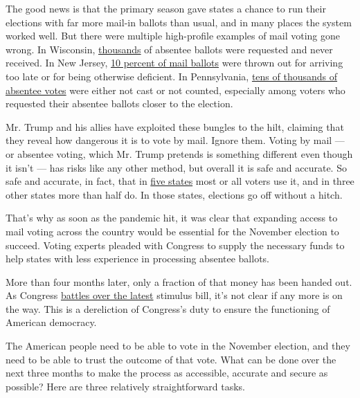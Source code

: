 The good news is that the primary season gave states a chance to run
their elections with far more mail-in ballots than usual, and in many
places the system worked well. But there were multiple high-profile
examples of mail voting gone wrong. In Wisconsin,
\href{https://www.nytimes3xbfgragh.onion/2020/04/09/us/politics/wisconsin-election-absentee-coronavirus.html}{thousands}
of absentee ballots were requested and never received. In New Jersey,
\href{https://www.njspotlight.com/2020/06/one-in-10-ballots-rejected-in-last-months-vote-by-mail-elections/}{10
percent of mail ballots} were thrown out for arriving too late or for
being otherwise deficient. In Pennsylvania,
\href{https://www.inquirer.com/politics/election/pa-mail-ballot-deadlines-disenfranchisement-20200730.html}{tens
of thousands of absentee votes} were either not cast or not counted,
especially among voters who requested their absentee ballots closer to
the election.

Mr. Trump and his allies have exploited these bungles to the hilt,
claiming that they reveal how dangerous it is to vote by mail. Ignore
them. Voting by mail --- or absentee voting, which Mr. Trump pretends is
something different even though it isn't --- has risks like any other
method, but overall it is safe and accurate. So safe and accurate, in
fact, that in
\href{https://www.ncsl.org/research/elections-and-campaigns/all-mail-elections.aspx}{five
states} most or all voters use it, and in three other states more than
half do. In those states, elections go off without a hitch.

That's why as soon as the pandemic hit, it was clear that expanding
access to mail voting across the country would be essential for the
November election to succeed. Voting experts pleaded with Congress to
supply the necessary funds to help states with less experience in
processing absentee ballots.

More than four months later, only a fraction of that money has been
handed out. As Congress
\href{https://www.nytimes3xbfgragh.onion/2020/07/30/opinion/mitch-mcconnell-coronavirus-economy.html}{battles
over the latest} stimulus bill, it's not clear if any more is on the
way. This is a dereliction of Congress's duty to ensure the functioning
of American democracy.

The American people need to be able to vote in the November election,
and they need to be able to trust the outcome of that vote. What can be
done over the next three months to make the process as accessible,
accurate and secure as possible? Here are three relatively
straightforward tasks.

